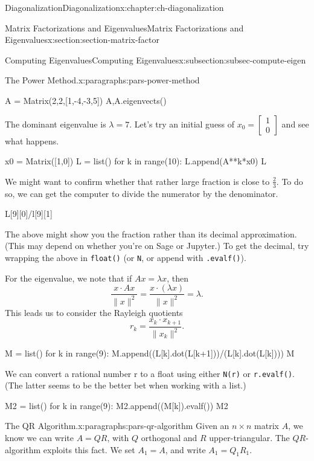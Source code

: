 \documentclass[oneside,10pt,]{book}
\newcommand{\mono}[1]{\texttt{#1}}
\numberwithin{equation}{section}
\begin{document}
\begin{chapterptx}{Diagonalization}{}{Diagonalization}{}{}{x:chapter:ch-diagonalization}
\begin{sectionptx}{Matrix Factorizations and Eigenvalues}{}{Matrix Factorizations and Eigenvalues}{}{}{x:section:section-matrix-factor}
\begin{subsectionptx}{Computing Eigenvalues}{}{Computing Eigenvalues}{}{}{x:subsection:subsec-compute-eigen}
\begin{paragraphs}{The Power Method.}{x:paragraphs:pars-power-method}
\begin{sageinput}
A = Matrix(2,2,[1,-4,-3,5])
A,A.eigenvects()
\end{sageinput}
The dominant eigenvalue is \(\lambda = 7\). Let's try an initial guess of \(x_0=\begin{bmatrix}1\\0\end{bmatrix}\) and see what happens.%
\begin{sageinput}
x0 = Matrix([1,0])
L = list()
for k in range(10):
    L.append(A**k*x0)
L
\end{sageinput}
We might want to confirm whether that rather large fraction is close to \(\frac23\). To do so, we can get the computer to divide the numerator by the denominator.%
\begin{sageinput}
L[9][0]/l[9][1]
\end{sageinput}
The above might show you the fraction rather than its decimal approximation. (This may depend on whether you're on Sage or Jupyter.) To get the decimal, try wrapping the above in \mono{float()} (or \mono{N}, or append with \mono{.evalf()}).%
\par
For the eigenvalue, we note that if \(Ax=\lambda x\), then%
\begin{equation*}
\frac{x\cdot Ax}{\lVert x\rVert^2} = \frac{x\cdot (\lambda x)}{\lVert x\rVert^2} = \lambda\text{.}
\end{equation*}
This leads us to consider the Rayleigh quotients%
\begin{equation*}
r_k = \frac{x_k\cdot x_{k+1}}{\lVert x_k\rVert^2}\text{.}
\end{equation*}
%
\begin{sageinput}
M = list()
for k in range(9):
    M.append((L[k].dot(L[k+1]))/(L[k].dot(L[k])))
M
\end{sageinput}
We can convert a rational number r to a float using either \mono{N(r)} or \mono{r.evalf()}. (The latter seems to be the better bet when working with a list.)%
\begin{sageinput}
M2 = list()
for k in range(9):
    M2.append((M[k]).evalf())
M2
\end{sageinput}
\end{paragraphs}%
\begin{paragraphs}{The QR Algorithm.}{x:paragraphs:pars-qr-algorithm}%
Given an \(n\times n\) matrix \(A\), we know we can write \(A=QR\), with \(Q\) orthogonal and \(R\) upper-triangular. The \(QR\)-algorithm exploits this fact. We set \(A_1=A\), and write \(A_1=Q_1R_1\).%
\par

\end{paragraphs}
\end{subsectionptx}
\end{sectionptx}
\end{chapterptx}
\end{document}
